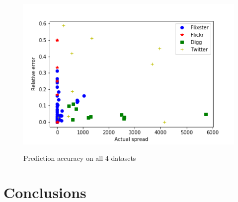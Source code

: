 \documentclass{acm_proc_article-sp}
\begin{document}
\begin{figure}[h]
	\includegraphics[width=\linewidth]{accuracy.png}
	\centering
	\label{accuracy}
    \caption{Prediction accuracy on all 4 datasets}
\end{figure}


\section{Conclusions}


%

%

\balancecolumns
\end{document}
